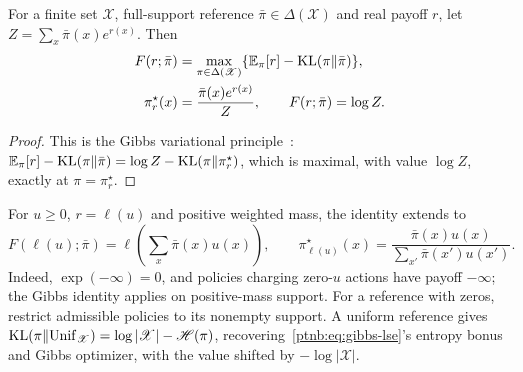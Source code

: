 \begin{lemmaenv}\label{ptnb:lem:kl-legendre-fenchel}
For a finite set $\mathcal X$, full-support reference $\bar\pi\in\Delta(\mathcal X)$ and real payoff $r$, let $Z=\sum_x\bar\pi(x)e^{r(x)}$. Then
\begin{align}
    F(r;\bar\pi)&=\max_{\pi\in\Delta(\mathscr X)}
       \{\mathbb{E}_\pi[r]-\mathrm{KL}(\pi\|\bar\pi)\},\label{ptnb:eq:kl-lf-objective}\\
    \pi_r^\star(x)&=\frac{\bar\pi(x)e^{r(x)}}{Z},
       \qquad F(r;\bar\pi)=\log Z.\label{ptnb:eq:kl-lf-optimizer}
\end{align}
\end{lemmaenv}
\begin{proof}
This is the Gibbs variational principle~\parencite{BoydVandenberghe2004}:
$\mathbb{E}_\pi[r]-\mathrm{KL}(\pi\|\bar\pi)=\log Z-\mathrm{KL}(\pi\|\pi_r^\star)$,
which is maximal, with value $\log Z$, exactly at $\pi=\pi_r^\star$.
\end{proof}
For $u\ge0$, $r=\ell(u)$ and positive weighted mass, the identity extends to
\begin{equation}\label{ptnb:eq:kl-lf-linearized}
    F(\ell(u);\bar\pi)=\ell\!\left(\sum_x\bar\pi(x)u(x)\right),
    \qquad \pi_{\ell(u)}^\star(x)=\frac{\bar\pi(x)u(x)}{\sum_{x'}\bar\pi(x')u(x')}.
\end{equation}
Indeed, $\exp(-\infty)=0$, and policies charging zero-$u$ actions have payoff $-\infty$; the Gibbs identity applies on positive-mass support. For a reference with zeros, restrict admissible policies to its nonempty support. A uniform reference gives $\mathrm{KL}(\pi\|\mathrm{Unif}_{\mathscr X})=\log|\mathscr X|-\mathscr{H}(\pi)$, recovering~\eqref{ptnb:eq:gibbs-lse}'s entropy bonus and Gibbs optimizer, with the value shifted by $-\log|\mathcal X|$.

